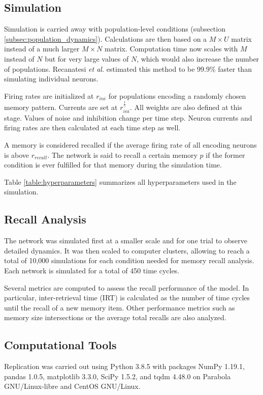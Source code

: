 \subsection{Simulation}

Simulation is carried away with population-level conditions (subsection \ref{subsec:population_dynamics}).
Calculations are then based on a \(M \times U\) matrix instead of a much larger \(M \times N\) matrix.
Computation time now scales with \(M\) instead of \(N\) but for very large values of \(N\), which would also increase the number of populations.
Recanatesi \textit{et al.} \parencite{recanatesi2015} estimated this method to be 99.9\% faster than simulating individual neurons.

Firing rates are initialized at \(r_{ini}\) for populations encoding a randomly chosen memory pattern.
Currents are set at \(r_{ini}^{\frac{1}{\gamma}}\).
All weights are also defined at this stage.
Values of noise and inhibition change per time step.
Neuron currents and firing rates are then calculated at each time step as well.

A memory is considered recalled if the average firing rate of all encoding neurons is above \(r_{recall}\).
The network is said to recall a certain memory \(p\) if the former condition is ever fulfilled for that memory during the simulation time.

Table \ref{table:hyperparameters} summarizes all hyperparameters used in the simulation.

\subsection{Recall Analysis}

The network was simulated first at a smaller scale and for one trial to observe detailed dynamics.
It was then scaled to computer clusters, allowing to reach a total of 10,000 simulations for each condition needed for memory recall analysis.
Each network is simulated for a total of 450 time cycles.

Several metrics are computed to assess the recall performance of the model.
In particular, inter-retrieval time (IRT) is calculated as the number of time cycles until the recall of a new memory item.
Other performance metrics such as memory size intersections or the average total recalls are also analyzed.

\subsection{Computational Tools}

Replication was carried out using Python 3.8.5 with packages NumPy 1.19.1, pandas 1.0.5, matplotlib 3.3.0, SciPy 1.5.2, and tqdm 4.48.0 on Parabola GNU/Linux-libre and CentOS GNU/Linux.